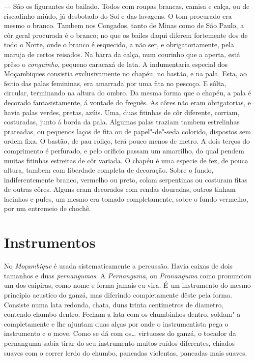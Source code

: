  --- São os figurantes do bailado. Todos com roupas
brancas, camisa e calça, ou de riscadinho miúdo, já desbotado do Sol e
das lavagens. O tom procurado era mesmo o branco. Tambem nos Congados,
tanto de Minas como de São Paulo, a côr geral procurada é o branco; no
que os bailes daqui diferem fortemente dos de todo o Norte, onde o
branco é esquecido, a não ser, e obrigatoriamente, pela maruja de certos
reisados. Na barra da calça, num courinho que a aperta, está prêso o
\emph{conguinho}, pequeno caracaxá de lata. A indumentaria especial dos
Moçambiques consistia exclusivamente no chapéu, no bastão, e na pala.
Esta, ao feitio das palas femininas, era amarrada por uma fita no
pescoço. E sôlta, circular, terminando na altura do ombro. Da mesma
forma que o chapéu, a pala é decorado fantasistamente, á vontade do
freguês. As côres não eram obrigatorias, e havia palas verdes, pretas,
azúis. Uma, duas fitinhas de côr diferente, corriam, costuradas, junto á
borda da pala. Algumas palas traziam tambem estrelinhas prateadas, ou
pequenos laços de fita ou de papel"-de"-seda colorido, dispostos sem ordem
fixa. O bastão, de pau roliço, terá pouco menos de metro. A dois terços
do comprimento é perfurado, e pelo orificio passam um amarrilho, do qual
pendem muitas fitinhas estreitas de côr variada. O chapéu é uma especie
de fez, de pouca altura, tambem com liberdade completa de decoração.
Sobre o fundo, indiferentemente branco, vermelho ou preto, colam
serpentinas ou costuram fitas de outras côres. Alguns eram decorados com
rendas douradas, outros tinham lacinhos e pufes, um mesmo era tomado
completamente, sobre o fundo vermelho, por um entremeio de chochê.

\section{Instrumentos}

No \emph{Moçambique} é usada sistematicamente a percussão. Havia caixas
de dois tamanhos e duas \emph{pernangumas}. A \emph{Pernanguma}, ou
\emph{Prananguma} como pronunciou um dos caipiras, como nome e forma
jamais eu vira. É um instrumento do mesmo princípio acustico do ganzá,
mas diferindo completamente dêste pela forma. Consiste numa lata
redonda, chata, duns trinta centimetros de diametro, contendo chumbo
dentro. Fecham a lata com os chumbinhos dentro, soldam"-a completamente e
lhe ajuntam duas alças por onde o instrumentista pega o instrumento e o
move. Como se dá com os\ldots{} virtuoses do ganzá, o tocador da pernanguma
sabia tirar do seu instrumento muitos ruídos diferentes, chiados suaves
com o correr lerdo do chumbo, pancadas violentas, pancadas mais suaves.

